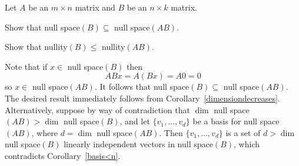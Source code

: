 \documentclass{ximera}
\begin{document}
\begin{exercise} \label{A5.6.2}
Let $A$ be an $m\times n$ matrix and $B$ be an $n\times k$ matrix. 
\begin{enumeratea}
\item Show that null space$(B) \subseteq$ null space$(AB)$.
\item Show that nullity$(B) \leq$ nullity$(AB)$.
\end{enumeratea}

\begin{solution}
\soln Note that if $x\in$ null space$(B)$ then 
\[
ABx=A(Bx)=A0=0
\]
so $x\in$ null space$(AB)$. It follows that null space$(B)\subseteq$ null space$(AB)$. The desired result immediately follows from Corollary~\ref{dimensiondecreases}. Alternatively, suppose by way of contradiction that $\dim$ null space$(AB)>\dim$ null space$(B)$, and let $\{v_1,\ldots,v_d\}$ be a basis for null space$(AB)$, where $d=\dim$ null space$(AB)$. Then $\{v_1,\ldots,v_d \}$ is a set of $d>\dim$ null space$(B)$ linearly independent vectors in null space$(B)$, which contradicts Corollary~\ref{basis<n}.
\end{solution}
\end{exercise}
\end{document}
